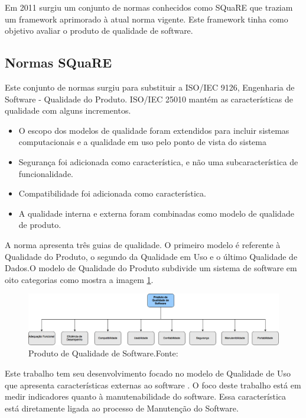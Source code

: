 Em 2011 surgiu um conjunto de normas conhecidos como SQuaRE que traziam um framework aprimorado à atual norma vigente. Este framework tinha como objetivo avaliar o produto de qualidade de software.

\subsection{Normas SQuaRE}
Este conjunto de normas surgiu para substituir a ISO/IEC 9126, Engenharia de Software - Qualidade do Produto. ISO/IEC 25010 mantém as características de qualidade com alguns incrementos.

\begin{itemize}
\item O escopo dos modelos de qualidade foram extendidos para incluir sistemas computacionais e a qualidade em uso pelo ponto de vista do sistema
\item Segurança foi adicionada como característica, e não uma subcaracterística de funcionalidade.
\item Compatibilidade foi adicionada como característica.
\item A qualidade interna e externa foram combinadas como modelo de qualidade de produto.
\end{itemize}

A norma apresenta três guias de qualidade. O primeiro modelo é referente à Qualidade do Produto, o segundo da Qualidade em Uso e o último Qualidade de Dados.O modelo de Qualidade do Produto subdivide um sistema de software em oito categorias como mostra a imagem \ref{img:modelo_square}.
\graphicspath{{figuras/}}
\begin{figure}
\centering
\includegraphics[scale=0.40]{SQuaRE}
\caption{Produto de Qualidade de Software.Fonte:\cite{Square}}
\label{img:modelo_square}
\end{figure}

Este trabalho tem seu desenvolvimento focado no modelo de Qualidade de Uso que apresenta características externas ao software \cite{Square}. O foco deste trabalho está em medir indicadores quanto à manutenabilidade do software. Essa característica está diretamente ligada ao processo de Manutenção do Software.  

